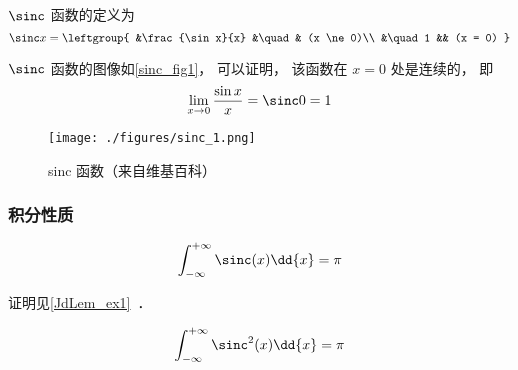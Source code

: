 

$\sinc$ 函数的定义为
\begin{equation}
\sinc x = 
\leftgroup{
&\frac{\sin x}{x} &\quad & (x \ne 0)\\
&\quad 1 && (x = 0)
}\end{equation}

$\sinc$ 函数的图像如\autoref{sinc_fig1}， 可以证明， 该函数在 $x=0$ 处是连续的， 即
\begin{equation}
\lim_{x \to 0}\frac{\sin x}{x} = \sinc 0 = 1
\end{equation}

\begin{figure}[ht]
\centering
\texttt{[image: ./figures/sinc\_1.png]}
\caption{sinc 函数（来自维基百科）} \label{sinc_fig1}
\end{figure}

\subsubsection{积分性质}
\begin{equation}\label{sinc_eq2}
\int_{-\infty}^{+\infty} \sinc(x) \dd{x} = \pi
\end{equation}

证明见\autoref{JdLem_ex1}~．

\begin{equation}\label{sinc_eq1}
\int_{-\infty}^{+\infty} \sinc^2(x) \dd{x} = \pi
\end{equation}











